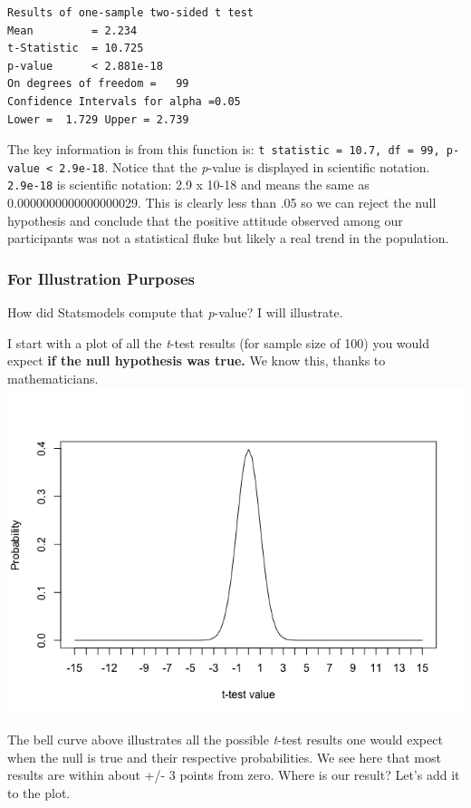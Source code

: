 \documentclass[11pt]{article}
\makeatletter
\def\maxwidth{\ifdim\Gin@nat@width>\linewidth\linewidth
    \else\Gin@nat@width\fi}
\let\Oldincludegraphics\includegraphics
\renewcommand{\includegraphics}[1]{\Oldincludegraphics[width=.8\maxwidth]{#1}}
\makeatother
\begin{document}
    \begin{Verbatim}[commandchars=\\\{\}]
Results of one-sample two-sided t test
Mean         = 2.234
t-Statistic  = 10.725
p-value      < 2.881e-18
On degrees of freedom =   99
Confidence Intervals for alpha =0.05
Lower =  1.729 Upper = 2.739

    \end{Verbatim}

    The key information is from this function is:
\texttt{t\ statistic\ =\ 10.7,\ df\ =\ 99,\ p-value\ \textless{}\ 2.9e-18}.
Notice that the \emph{p}-value is displayed in scientific notation.
\texttt{2.9e-18} is scientific notation: 2.9 x 10-18 and means the same
as 0.0000000000000000029. This is clearly less than .05 so we can reject
the null hypothesis and conclude that the positive attitude observed
among our participants was not a statistical fluke but likely a real
trend in the population.

\subsubsection{For Illustration
Purposes}\label{for-illustration-purposes}

How did Statsmodels compute that \emph{p}-value? I will illustrate.

I start with a plot of all the \emph{t}-test results (for sample size of
100) you would expect \textbf{if the null hypothesis was true.} We know
this, thanks to mathematicians.
\includegraphics{img/unnamed-chunk-8-1.png}

The bell curve above illustrates all the possible \emph{t}-test results
one would expect when the null is true and their respective
probabilities. We see here that most results are within about +/- 3
points from zero. Where is our result? Let's add it to the plot.
\end{document}
